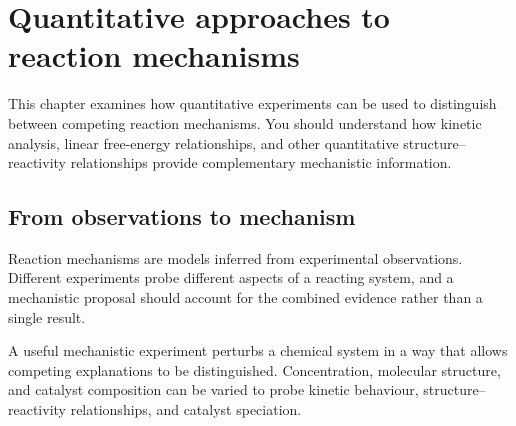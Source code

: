 
\chapter{Quantitative approaches to reaction mechanisms}

\begin{notebox} 
    This chapter examines how quantitative experiments can be used to distinguish between competing reaction mechanisms. 
    You should understand how kinetic analysis, linear free-energy relationships, and other quantitative structure–reactivity relationships provide complementary mechanistic information. 
\end{notebox} 

\section{From observations to mechanism}

Reaction mechanisms are models inferred from experimental observations.
Different experiments probe different aspects of a reacting system, and a mechanistic proposal should account for the combined evidence rather than a single result.

A useful mechanistic experiment perturbs a chemical system in a way that allows competing explanations to be distinguished.
Concentration, molecular structure, and catalyst composition can be varied to probe kinetic behaviour, structure--reactivity relationships, and catalyst speciation.

